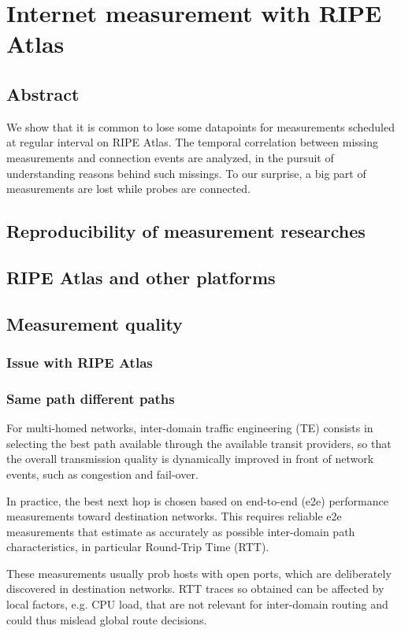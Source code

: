 \chapter{Internet measurement with RIPE Atlas}

\section*{Abstract}
We show that it is common to lose some datapoints for measurements scheduled at regular interval on RIPE Atlas. 
The temporal correlation between missing measurements and connection events are %
analyzed, in the pursuit of understanding reasons behind such missings.
To our surprise, a big part of measurements are lost while probes are connected.
\section{Reproducibility of measurement researches}
\section{RIPE Atlas and other platforms}
\section{Measurement quality}
\subsection{Issue with RIPE Atlas}
\subsection{Same path different paths}
For multi-homed networks, inter-domain traffic engineering (TE) 
consists in selecting the best path available through the available transit providers,
so that the overall transmission quality is dynamically improved in front of network events, such as congestion and fail-over. 

In practice, the best next hop is chosen based on end-to-end (e2e) performance measurements toward destination networks. 
This requires reliable e2e measurements that estimate as accurately as possible inter-domain path characteristics, in particular Round-Trip Time (RTT).

These measurements usually prob
hosts with open ports, which are deliberately discovered in destination networks.
RTT traces so obtained can be affected by local factors, e.g. CPU load, that are not relevant for inter-domain routing and could thus mislead global route decisions. 

